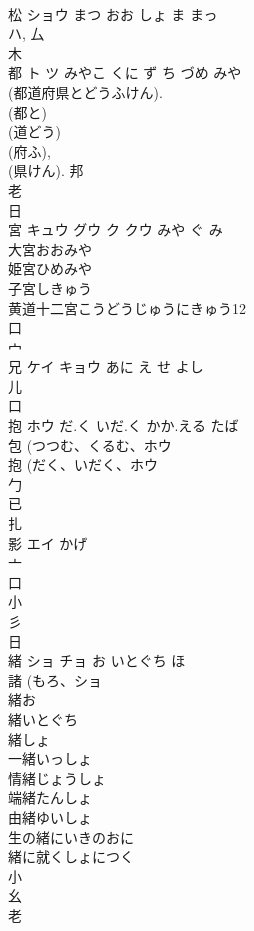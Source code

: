 \documentclass[8pt]{extreport}
\begin{document}
\begin{CJK}{UTF8}{min}
\\	松	ショウ	まつ おお しょ ま まっ	
\\	ハ, 厶 
\\	木 
\\	都	ト ツ	みやこ くに ず ち づめ みや	
\\	(都道府県とどうふけん). 
\\	(都と) 
\\	(道どう) 
\\	(府ふ), 
\\	(県けん).		邦 
\\	老 
\\	日 
\\	宮	キュウ グウ ク クウ	みや ぐ み	
\\	大宮おおみや
\\	姫宮ひめみや
\\	子宮しきゅう
\\	黄道十二宮こうどうじゅうにきゅう12 
\\	口 
\\	宀 
\\	兄	ケイ キョウ	あに え せ よし	
\\	儿 
\\	口 
\\	抱	ホウ	だ.く いだ.く かか.える たば	
\\	包 (つつむ、くるむ、ホウ 
\\	抱 (だく、いだく、ホウ 
\\	勹 
\\	已 
\\	扎	
\\	影	エイ	かげ	
\\	亠 
\\	口 
\\	小 
\\	彡 
\\	日 
\\	緒	ショ チョ	お いとぐち ほ	
\\	諸 (もろ、ショ 
\\	緒お
\\	緒いとぐち
\\	緒しょ
\\	一緒いっしょ
\\	情緒じょうしょ
\\	端緒たんしょ
\\	由緒ゆいしょ
\\	生の緒にいきのおに
\\	緒に就くしょにつく
\\	小 
\\	幺 
\\	老 

\end{CJK}
\end{document}
